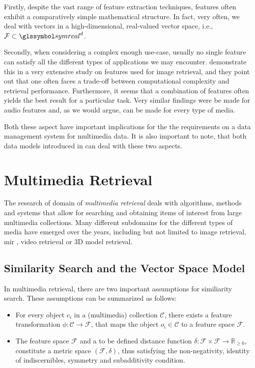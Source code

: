 Firstly, despite the vast range of feature extraction techniques, features often exhibit a comparatively simple mathematical structure. In fact, very often, we deal with vectors in a high-dimensional, real-valued vector space, i.e., $\mathcal{F} \subset \symreal^d$. 

Secondly, when considering a complex enough use-case, usually no single feature can satisfy all the different types of applications we may encounter. \cite{Deselaers:2008Features} demonstrate this in a very extensive study on features used for image retrieval, and they point out that one often faces a trade-off between computational complexity and retrieval performance. Furthermore, it seems that a combination of features often yields the best result for a particular task. Very similar findings were be made for audio features  and, as we would argue, can be made for every type of media.

Both these aspect have important implications for the the requirements on a data management system for multimedia data. It is also important to note, that both data models introduced in  can deal with these two aspects.

\section{Multimedia Retrieval}

The research of domain of \emph{multimedia retrieval} deals with algorithms, methods and systems that allow for searching and obtaining items of interest from large multimedia collections. Many different subdomains for the different types of media have emerged over the years, including but not limited to image retrieval, \acrfull{mir} \cite{Simonetta:2019Multimodal}, video retrieval or 3D model retrieval.

\subsection{Similarity Search and the Vector Space Model}

In multimedia retrieval, there are two important assumptions for similiarity search. These assumptions can be summarized as follows:

\begin{itemize}
    \item For every object $c_{i}$ in a (multimedia) collection $\mathcal{C}$, there exists a feature transformation $\phi \colon \mathcal{C} \to \mathcal{F}$, that maps the object $o_{i} \in \mathcal{C}$ to a feature space $\mathcal{F}$.
    \item The feature space $\mathcal{F}$ and a to be defined distance function $\delta \colon \mathcal{F} \times \mathcal{F} \to \mathbb{R}_{\geq 0}$, constitute a metric space $(\mathcal{F},\delta)$, thus satisfying the non-negativity, identity of indiscernibles, symmetry and subadditivity condition.
\end{itemize}

